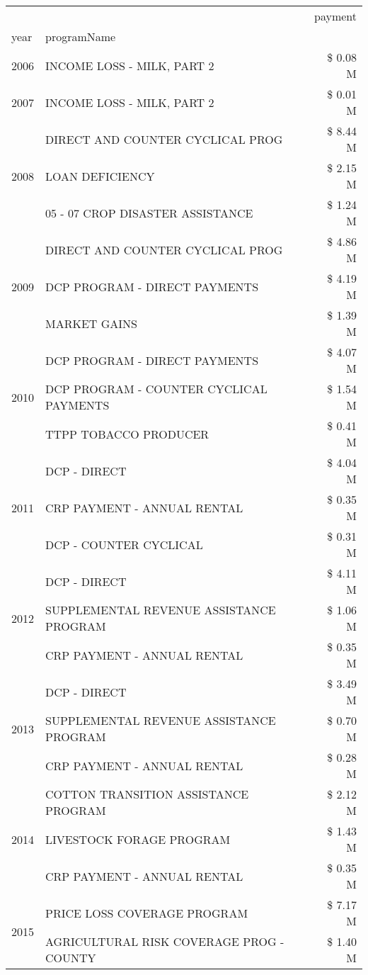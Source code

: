 \begin{tabular}{llr}
\toprule
 &  & payment \\
year & programName &  \\
\midrule
2006 & INCOME LOSS - MILK, PART 2 & \$ 0.08 M \\
\cline{1-3}
2007 & INCOME LOSS - MILK, PART 2 & \$ 0.01 M \\
\cline{1-3}
\multirow[t]{3}{*}{2008} & DIRECT AND COUNTER CYCLICAL PROG & \$ 8.44 M \\
 & LOAN DEFICIENCY & \$ 2.15 M \\
 & 05 - 07 CROP DISASTER ASSISTANCE & \$ 1.24 M \\
\cline{1-3}
\multirow[t]{3}{*}{2009} & DIRECT AND COUNTER CYCLICAL PROG & \$ 4.86 M \\
 & DCP PROGRAM - DIRECT PAYMENTS & \$ 4.19 M \\
 & MARKET GAINS & \$ 1.39 M \\
\cline{1-3}
\multirow[t]{3}{*}{2010} & DCP PROGRAM - DIRECT PAYMENTS & \$ 4.07 M \\
 & DCP PROGRAM - COUNTER CYCLICAL PAYMENTS & \$ 1.54 M \\
 & TTPP TOBACCO PRODUCER & \$ 0.41 M \\
\cline{1-3}
\multirow[t]{3}{*}{2011} & DCP - DIRECT & \$ 4.04 M \\
 & CRP PAYMENT - ANNUAL RENTAL & \$ 0.35 M \\
 & DCP - COUNTER CYCLICAL & \$ 0.31 M \\
\cline{1-3}
\multirow[t]{3}{*}{2012} & DCP - DIRECT & \$ 4.11 M \\
 & SUPPLEMENTAL REVENUE ASSISTANCE PROGRAM & \$ 1.06 M \\
 & CRP PAYMENT - ANNUAL RENTAL & \$ 0.35 M \\
\cline{1-3}
\multirow[t]{3}{*}{2013} & DCP - DIRECT & \$ 3.49 M \\
 & SUPPLEMENTAL REVENUE ASSISTANCE PROGRAM & \$ 0.70 M \\
 & CRP PAYMENT - ANNUAL RENTAL & \$ 0.28 M \\
\cline{1-3}
\multirow[t]{3}{*}{2014} & COTTON TRANSITION ASSISTANCE PROGRAM & \$ 2.12 M \\
 & LIVESTOCK FORAGE PROGRAM & \$ 1.43 M \\
 & CRP PAYMENT - ANNUAL RENTAL & \$ 0.35 M \\
\cline{1-3}
\multirow[t]{3}{*}{2015} & PRICE LOSS COVERAGE PROGRAM & \$ 7.17 M \\
 & AGRICULTURAL RISK COVERAGE PROG - COUNTY & \$ 1.40 M \\

\end{tabular}
